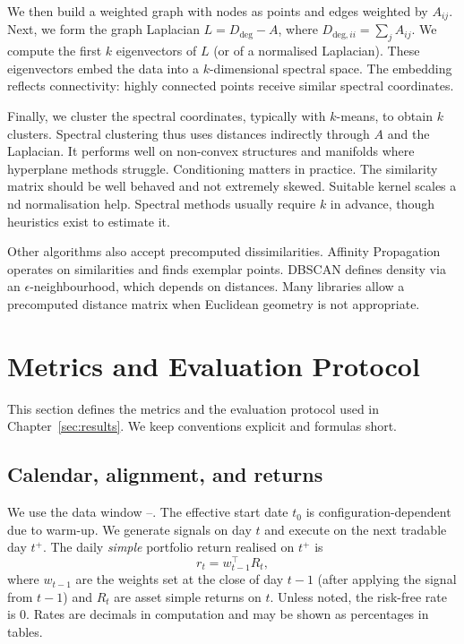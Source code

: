 We then build a weighted graph with nodes as points and edges weighted by $A_{ij}$. Next, we form the graph Laplacian $L=D_{\text{deg}}-A$, where $D_{\text{deg},ii}=\sum_j A_{ij}$. We compute the first $k$ eigenvectors of $L$ (or of a normalised Laplacian). These eigenvectors embed the data into a $k$-dimensional spectral space. The embedding reflects connectivity: highly connected points receive similar spectral coordinates.

Finally, we cluster the spectral coordinates, typically with $k$-means, to obtain $k$ clusters. Spectral clustering thus uses distances indirectly through $A$ and the Laplacian. It performs well on non-convex structures and manifolds where hyperplane methods struggle. Conditioning matters in practice. The similarity matrix should be well behaved and not extremely skewed. Suitable kernel scales a nd normalisation help. Spectral methods usually require $k$ in advance, though heuristics exist to estimate it.

Other algorithms also accept precomputed dissimilarities. Affinity Propagation operates on similarities and finds exemplar points. DBSCAN defines density via an $\epsilon$-neighbourhood, which depends on distances. Many libraries allow a precomputed distance matrix when Euclidean geometry is not appropriate.

\section{Metrics and Evaluation Protocol}\label{app:metrics}

This section defines the metrics and the evaluation protocol used in Chapter~\ref{sec:results}. We keep conventions explicit and formulas short.

\subsection{Calendar, alignment, and returns}
We use the data window \sampleStart{}–\sampleEnd{}. The effective start date $t_0$ is configuration-dependent due to warm-up. We generate signals on day $t$ and execute on the next tradable day $t^+$. The daily \emph{simple} portfolio return realised on $t^+$ is
\[
r_t = w_{t-1}^\top R_t,
\]
where $w_{t-1}$ are the weights set at the close of day $t-1$ (after applying the signal from $t-1$) and $R_t$ are asset simple returns on $t$. Unless noted, the risk-free rate is $0$. Rates are decimals in computation and may be shown as percentages in tables.

